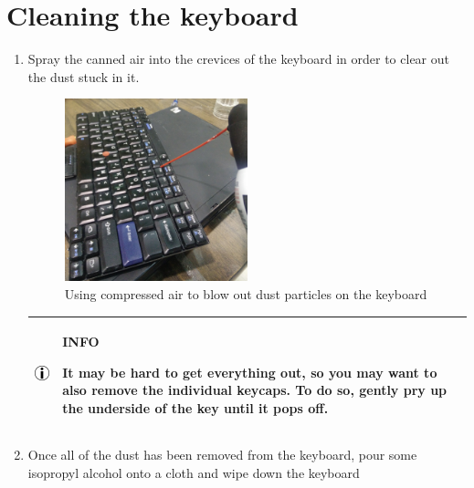 \documentclass{article}
\newcommand{\alertinfobox}[2]{
	\begin{center}
		\begin{tabularx}{0.9\linewidth}{| c X |}
			\hline
			\raisebox{\dimexpr2\baselineskip-\height}
			{\includegraphics[width=0.5in]{info.jpg}}&
			\raisebox{\tabcolsep}{\strut}\par\textbf{#1}\par#2\raisebox{-\tabcolsep}{\strut} \\ \hline
		\end{tabularx}
	\end{center}
}
\begin{document}
\section*{Cleaning the keyboard}
\begin{enumerate}
	\item Spray the canned air into the crevices of the keyboard in order to clear out the dust stuck in it.

	\begin{figure}[H]
		\centering
		\includegraphics[width=0.5\textwidth]{aircankeyboard.jpg}
		\caption{Using compressed air to blow out dust particles on the keyboard}
	\end{figure}

	\alertinfobox{INFO}{
		It may be hard to get everything out, so you may want to also remove the individual keycaps.
		To do so, gently pry up the underside of the key until it pops off.
	}

	\item Once all of the dust has been removed from the keyboard, pour some isopropyl alcohol onto a cloth and wipe down the keyboard

\end{enumerate}

\clearpage
\end{document}
